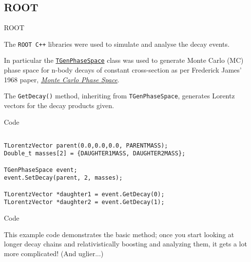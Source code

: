 \subsection{ROOT}
\begin{frame}[fragile]{ROOT}
    \begin{itemize}

    \Item The \texttt{ROOT C++} libraries were used to simulate and analyse the
        decay events. 
    
    \Item In particular the
        \href{http://root.cern.ch/root/html/TGenPhaseSpace.html}{\texttt{TGenPhaseSpace}}
        class was used to generate Monte Carlo (MC) phase space for n-body
        decays of constant cross-section as per Frederick James' 1968 paper,
        \href{http://cds.cern.ch/record/275743}{\textit{Monte Carlo Phase
        Space}}.
    
    \Item The \texttt{GetDecay()} method, inheriting from
        \texttt{TGenPhaseSpace}, generates Lorentz vectors for the decay
        products given.

\end{itemize}
\end{frame}

\begin{frame}[fragile]{Code}
\begin{verbatim}

TLorentzVector parent(0.0,0.0,0.0, PARENTMASS);
Double_t masses[2] = {DAUGHTER1MASS, DAUGHTER2MASS};

TGenPhaseSpace event;
event.SetDecay(parent, 2, masses);

TLorentzVector *daughter1 = event.GetDecay(0);
TLorentzVector *daughter2 = event.GetDecay(1);

\end{verbatim}
\end{frame}

\begin{frame}{Code}

This example code demonstrates the basic method; once you start looking at
longer decay chains and relativistically boosting and analyzing them, it gets a
lot more complicated! (And uglier...)

\end{frame}

